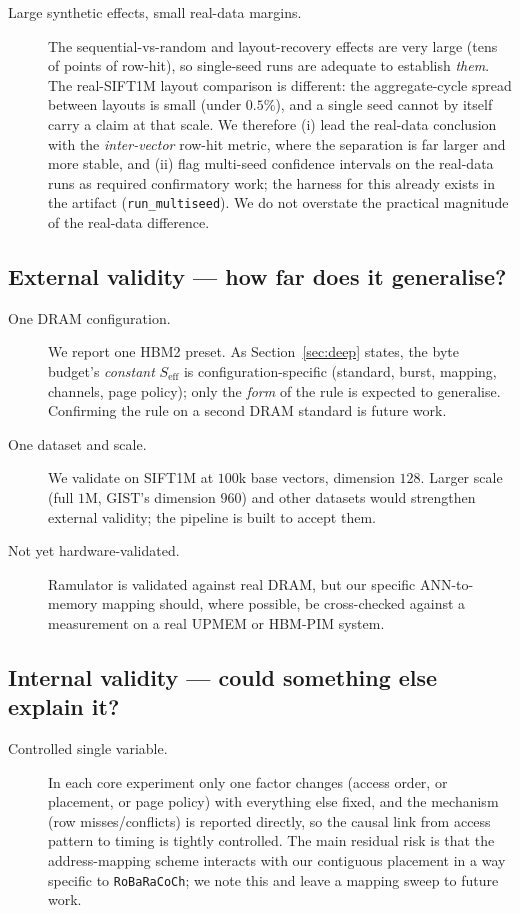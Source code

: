 \documentclass[11pt,a4paper]{article}
\begin{document}
\begin{description}
\item[Large synthetic effects, small real-data margins.] The sequential-vs-random and
layout-recovery effects are very large (tens of points of row-hit), so single-seed runs are adequate
to establish \emph{them}. The real-SIFT1M layout comparison is different: the aggregate-cycle spread
between layouts is small (under $0.5\%$), and a single seed cannot by itself carry a claim at that
scale. We therefore (i) lead the real-data conclusion with the \emph{inter-vector} row-hit metric,
where the separation is far larger and more stable, and (ii) flag multi-seed confidence intervals on
the real-data runs as required confirmatory work; the harness for this already exists in the artifact
(\texttt{run\_multiseed}). We do not overstate the practical magnitude of the real-data difference.
\end{description}

\subsection{External validity --- how far does it generalise?}

\begin{description}
\item[One DRAM configuration.] We report one HBM2 preset. As Section~\ref{sec:deep} states, the byte
budget's \emph{constant} $S_\text{eff}$ is configuration-specific (standard, burst, mapping, channels,
page policy); only the \emph{form} of the rule is expected to generalise. Confirming the rule on a
second DRAM standard is future work.
\item[One dataset and scale.] We validate on SIFT1M at $100$k base vectors, dimension $128$. Larger
scale (full $1$M, GIST's dimension $960$) and other datasets would strengthen external validity; the
pipeline is built to accept them.
\item[Not yet hardware-validated.] Ramulator is validated against real DRAM, but our specific
ANN-to-memory mapping should, where possible, be cross-checked against a measurement on a real UPMEM
or HBM-PIM system.
\end{description}

\subsection{Internal validity --- could something else explain it?}

\begin{description}
\item[Controlled single variable.] In each core experiment only one factor changes (access order, or
placement, or page policy) with everything else fixed, and the mechanism (row misses/conflicts) is
reported directly, so the causal link from access pattern to timing is tightly controlled. The main
residual risk is that the address-mapping scheme interacts with our contiguous placement in a way
specific to \texttt{RoBaRaCoCh}; we note this and leave a mapping sweep to future work.
\end{description}
\end{document}
